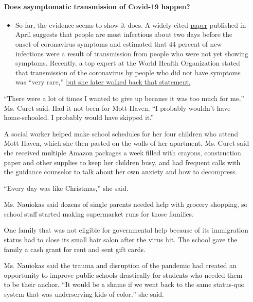 \begin{itemize}
{  \paragraph{Does asymptomatic transmission of Covid-19
  happen?}\label{does-asymptomatic-transmission-of-covid-19-happen}}

  \begin{itemize}
  \tightlist
  \item
    So far, the evidence seems to show it does. A widely cited
    \href{https://www.nature.com/articles/s41591-020-0869-5}{paper}
    published in April suggests that people are most infectious about
    two days before the onset of coronavirus symptoms and estimated that
    44 percent of new infections were a result of transmission from
    people who were not yet showing symptoms. Recently, a top expert at
    the World Health Organization stated that transmission of the
    coronavirus by people who did not have symptoms was ``very rare,''
    \href{https://www.nytimes.com/2020/06/09/world/coronavirus-updates.html?action=click\&pgtype=Article\&state=default\&region=MAIN_CONTENT_3\&context=storylines_faq\#link-1f302e21}{but
    she later walked back that statement.}
  \end{itemize}
\end{itemize}

``There were a lot of times I wanted to give up because it was too much
for me,'' Ms. Curet said. Had it not been for Mott Haven, ``I probably
wouldn't have home-schooled. I probably would have skipped it.''

A social worker helped make school schedules for her four children who
attend Mott Haven, which she then pasted on the walls of her apartment.
Ms. Curet said she received multiple Amazon packages a week filled with
crayons, construction paper and other supplies to keep her children
busy, and had frequent calls with the guidance counselor to talk about
her own anxiety and how to decompress.

``Every day was like Christmas,'' she said.

Ms. Nauiokas said dozens of single parents needed help with grocery
shopping, so school staff started making supermarket runs for those
families.

One family that was not eligible for governmental help because of its
immigration status had to close its small hair salon after the virus
hit. The school gave the family a cash grant for rent and sent gift
cards.

Ms. Nauiokas said the trauma and disruption of the pandemic had created
an opportunity to improve public schools drastically for students who
needed them to be their anchor. ``It would be a shame if we went back to
the same status-quo system that was underserving kids of color,'' she
said.

